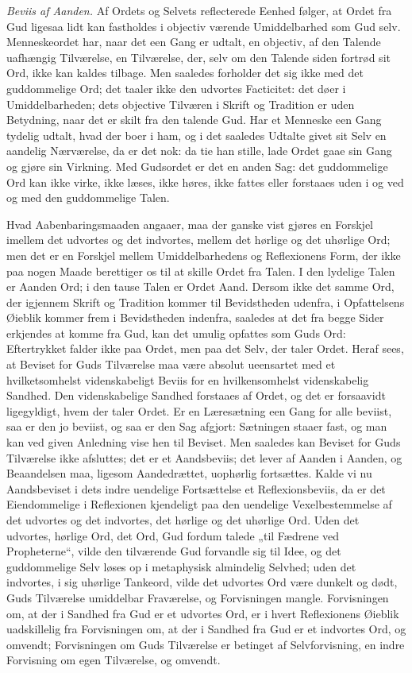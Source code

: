 \documentclass[12pt]{book}
\begin{document}
\emph{Beviis af Aanden.} Af Ordets og Selvets reflecterede Eenhed
følger, at Ordet fra Gud ligesaa lidt kan fastholdes i objectiv
værende Umiddelbarhed som Gud selv. Menneskeordet har, naar det een
Gang er udtalt, en objectiv, af den Talende uafhængig Tilværelse, en
Tilværelse, der, selv om den Talende siden fortrød sit Ord, ikke kan
kaldes tilbage. Men saaledes forholder det sig ikke med det
guddommelige Ord; det taaler ikke den udvortes Facticitet: det døer
i Umiddelbarheden; dets objective Tilværen i Skrift og Tradition er
uden Betydning, naar det er skilt fra den talende Gud. Har et
Menneske een Gang tydelig udtalt, hvad der boer i ham, og i det
saaledes Udtalte givet sit Selv en aandelig Nærværelse, da er det
nok: da tie han stille, lade Ordet gaae sin Gang og gjøre sin
Virkning. Med Gudsordet er det en anden Sag: det guddommelige Ord
kan ikke virke, ikke læses, ikke høres, ikke fattes eller forstaaes
uden i og ved og med den guddommelige Talen.

Hvad Aabenbaringsmaaden angaaer, maa der ganske vist gjøres en
Forskjel imellem det udvortes og det indvortes, mellem det hørlige
og det uhørlige Ord; men det er en Forskjel mellem Umiddelbarhedens
og Reflexionens Form, der ikke paa nogen Maade berettiger os til at
skille Ordet fra Talen. I den lydelige Talen er Aanden Ord; i den
tause Talen er Ordet Aand. Dersom ikke det samme Ord, der igjennem
Skrift og Tradition kommer til Bevidstheden udenfra, i Opfattelsens
Øieblik kommer frem i Bevidstheden indenfra, saaledes at det fra
begge Sider erkjendes at komme fra Gud, kan det umulig opfattes som
Guds Ord: Eftertrykket falder ikke paa Ordet, men paa det Selv, der
taler Ordet.
Heraf sees, at Beviset for Guds Tilværelse maa være absolut
ueensartet med et hvilketsomhelst videnskabeligt Beviis for en
hvilkensomhelst videnskabelig Sandhed. Den videnskabelige Sandhed
forstaaes af Ordet, og det er forsaavidt ligegyldigt, hvem der taler
Ordet. Er en Læresætning een Gang for alle beviist, saa er den jo
beviist, og saa er den Sag afgjort: Sætningen staaer fast, og man
kan ved given Anledning vise hen til Beviset. Men saaledes kan
Beviset for Guds Tilværelse ikke afsluttes; det er et Aandsbeviis;
det lever af Aanden i Aanden, og Beaandelsen maa, ligesom
Aandedrættet, uophørlig fortsættes. Kalde vi nu Aandsbeviset i dets
indre uendelige Fortsættelse et Reflexionsbeviis, da er det
Eiendommelige i Reflexionen kjendeligt paa den uendelige
Vexelbestemmelse af det udvortes og det indvortes, det hørlige og
det uhørlige Ord. Uden det udvortes, hørlige Ord, det Ord, Gud
fordum talede „til Fædrene ved Propheterne“, vilde den tilværende
Gud forvandle sig til Idee, og det guddommelige Selv løses op i
metaphysisk almindelig Selvhed; uden det indvortes, i sig uhørlige
Tankeord, vilde det udvortes Ord være dunkelt og dødt, Guds
Tilværelse umiddelbar Fraværelse, og Forvisningen mangle.
Forvisningen om, at der i Sandhed fra Gud er et udvortes Ord, er i
hvert Reflexionens Øieblik uadskillelig fra Forvisningen om, at der
i Sandhed fra Gud er et indvortes Ord, og omvendt; Forvisningen om
Guds Tilværelse er betinget af Selvforvisning, en indre Forvisning
om egen Tilværelse, og omvendt.
\end{document}

